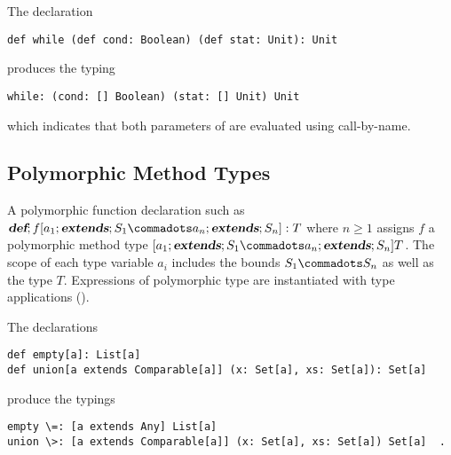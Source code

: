 \documentclass[11pt]{report}
\begin{document}
\example The declaration
\begin{verbatim}
def while (def cond: Boolean) (def stat: Unit): Unit
\end{verbatim}
produces the typing
\begin{verbatim}
while: (cond: [] Boolean) (stat: [] Unit) Unit
\end{verbatim}
which indicates that both parameters of \verb@while@ are evaluated using
call-by-name.


\subsection{Polymorphic Method Types}
\label{sec:poly-types}

A polymorphic function declaration such as $\DEF;f[a_1 \extends S_1
\commadots a_n \extends S_n]: T$ where $n \geq 1$ assigns $f$ a polymorphic
method type $[a_1 \extends S_1 \commadots a_n \extends S_n] T$.
The scope of each
type variable $a_i$ includes the bounds $S_1 \commadots S_n$ as well
as the type $T$.  Expressions of polymorphic type are instantiated
with type applications ().

\example The declarations
\begin{verbatim}
def empty[a]: List[a]
def union[a extends Comparable[a]] (x: Set[a], xs: Set[a]): Set[a]
\end{verbatim}
produce the typings
\begin{verbatim}
empty \=: [a extends Any] List[a]
union \>: [a extends Comparable[a]] (x: Set[a], xs: Set[a]) Set[a]  .
\end{verbatim}
\end{document}
